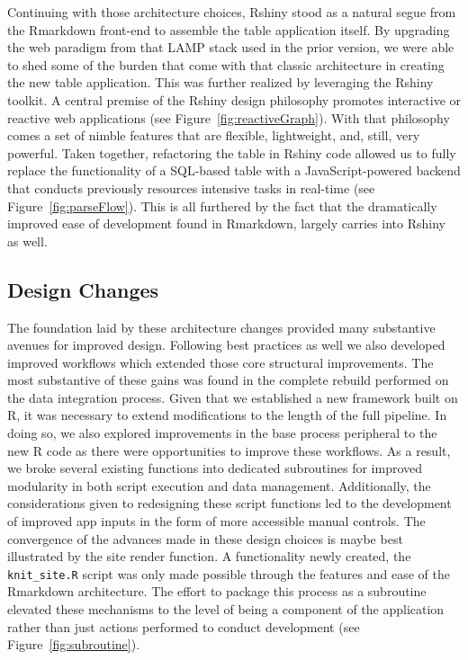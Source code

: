 \documentclass[10pt]{report}
\begin{document}
Continuing with those architecture choices, Rshiny stood as a natural segue from the Rmarkdown front-end to assemble the table application itself. By upgrading the web paradigm from that LAMP stack used in the prior version, we were able to shed some of the burden that come with that classic architecture in creating the new table application. This was further realized by leveraging the Rshiny toolkit. A central premise of the Rshiny design philosophy promotes interactive or reactive web applications (see Figure~\ref{fig:reactiveGraph}). With that philosophy comes a set of nimble features that are flexible, lightweight, and, still, very powerful. Taken together, refactoring the table in Rshiny code allowed us to fully replace the functionality of a SQL-based table with a JavaScript-powered backend that conducts previously resources intensive tasks in real-time (see Figure~\ref{fig:parseFlow}). This is all furthered by the fact that the dramatically improved ease of development found in Rmarkdown, largely carries into Rshiny as well.

\subsection{Design Changes}
The foundation laid by these architecture changes provided many substantive avenues for improved design. Following best practices as well we also developed improved workflows which extended those core structural improvements. The most substantive of these gains was found in the complete rebuild performed on the data integration process. Given that we established a new framework built on R, it was necessary to extend modifications to the length of the full pipeline. In doing so, we also explored improvements in the base process peripheral to the new R code as there were opportunities to improve these workflows. As a result, we broke several existing functions into dedicated subroutines for improved modularity in both script execution and data management. Additionally, the considerations given to redesigning these script functions led to the development of improved app inputs in the form of more accessible manual controls. The convergence of the advances made in these design choices is maybe best illustrated by the site render function. A functionality newly created, the \texttt{knit\_site.R} script was only made possible through the features and ease of the Rmarkdown architecture. The effort to package this process as a subroutine elevated these mechanisms to the level of being a component of the application rather than just actions performed to conduct development (see Figure~\ref{fig:subroutine}).
\end{document}
